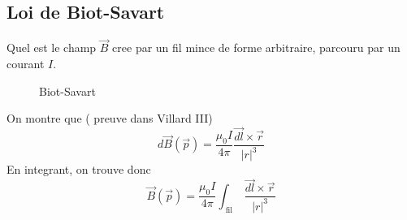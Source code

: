 \documentclass[../main.tex]{subfiles}
\begin{document}
\subsection{Loi de Biot-Savart}
Quel est le champ $\vec{B}$ cree par un fil mince de forme arbitraire, parcouru par un courant $I$.\\
\begin{figure}[H]
    \centering
    \caption{Biot-Savart}
    \label{fig:biot-savart}
\end{figure}
On montre que ( preuve dans Villard III) 
\[ 
	d \vec{B}( \vec{p}) = \frac{\mu_0 I}{4\pi} \frac{\vec{dl} \times \vec{r}}{|r|^{3}}
\]
En integrant, on trouve donc 
\[ 
	\vec{B}( \vec{p})= \frac{\mu_0I}{4 \pi} \int_{ \text{ fil } } \frac{\vec{dl} \times \vec{r}}{|r|^{3}}
\]
\end{document}
